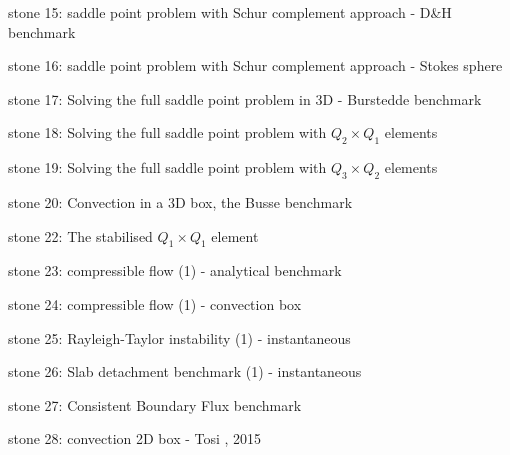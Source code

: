 {\noindent stone 15: saddle point problem with Schur complement approach - D\&H benchmark 


\noindent stone 16: saddle point problem with Schur complement approach - Stokes sphere 


\noindent stone 17: Solving the full saddle point problem in 3D - Burstedde benchmark \cite{dobo04} 


\noindent stone 18: Solving the full saddle point problem with $Q_2\times Q_1$ elements 


\noindent stone 19: Solving the full saddle point problem with $Q_3\times Q_2$ elements 


\noindent stone 20: Convection in a 3D box, the Busse benchmark \cite{bucc94}


\noindent stone 22: The stabilised $Q_1 \times Q_1$ element 


\noindent stone 23: compressible flow (1) - analytical benchmark 


\noindent stone 24: compressible flow (1) - convection box 


\noindent stone 25: Rayleigh-Taylor instability (1) - instantaneous \cite{vaks97}


\noindent stone 26: Slab detachment benchmark (1) - instantaneous 


\noindent stone 27: Consistent Boundary Flux benchmark


\noindent stone 28: convection 2D box - Tosi \etal, 2015


}
